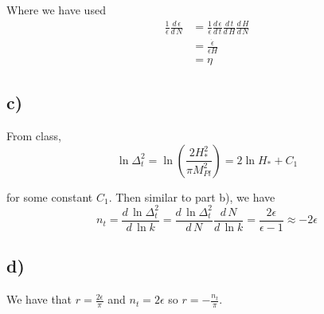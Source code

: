 \documentclass{article}
\newcommand{\tot}[2]{\frac{d\,#1}{d\,#2}}
\begin{document}
Where we have used
\begin{align*}
\frac{1}{\epsilon}\tot{\epsilon}{N} &= \frac{1}{\epsilon}\tot{\epsilon}{t}\tot{t}{H}\tot{H}{N}\\
&= \frac{\dot{\epsilon}}{\epsilon H}\\
&=\eta
\end{align*}
\subsection*{c)}
From class,
\[\ln \Delta_t^2 = \ln\left(\frac{2H_*^2}{\pi M_{Pl}^2}\right) = 2\ln H_* + C_1\]

for some constant $C_1$. Then similar to part b), we have
\[n_t=\tot{\ln \Delta_t^2}{\ln k} = \tot{\ln \Delta_t^2}{N}\tot{N}{\ln k} = \frac{2\epsilon}{\epsilon-1}\approx -2\epsilon\]

\subsection*{d)}

We have that $r = \frac{2\epsilon}{\pi}$ and $n_t = 2\epsilon$ so $r=-\frac{n_t}{\pi}$.
\end{document}
